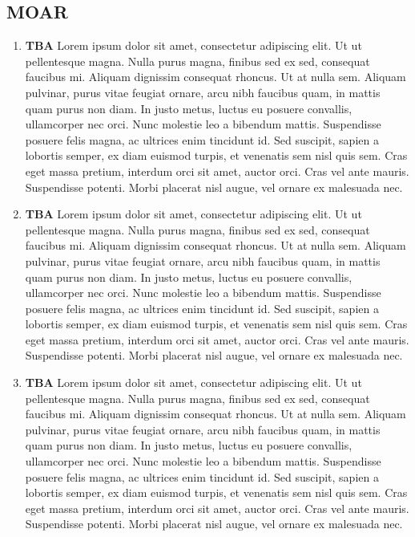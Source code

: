 \subsection{MOAR}\label{subsec:moar}
\begin{enumerate}[label= -]
    \item \textbf{TBA} Lorem ipsum dolor sit amet, consectetur adipiscing elit.
    Ut ut pellentesque magna.
    Nulla purus magna, finibus sed ex sed, consequat faucibus mi.
    Aliquam dignissim consequat rhoncus.
    Ut at nulla sem.
    Aliquam pulvinar, purus vitae feugiat ornare, arcu nibh faucibus quam, in mattis quam purus non diam.
    In justo metus, luctus eu posuere convallis, ullamcorper nec orci.
    Nunc molestie leo a bibendum mattis.
    Suspendisse posuere felis magna, ac ultrices enim tincidunt id.
    Sed suscipit, sapien a lobortis semper, ex diam euismod turpis, et venenatis sem nisl quis sem.
    Cras eget massa pretium, interdum orci sit amet, auctor orci.
    Cras vel ante mauris.
    Suspendisse potenti.
    Morbi placerat nisl augue, vel ornare ex malesuada nec.
    \item \textbf{TBA} Lorem ipsum dolor sit amet, consectetur adipiscing elit.
    Ut ut pellentesque magna.
    Nulla purus magna, finibus sed ex sed, consequat faucibus mi.
    Aliquam dignissim consequat rhoncus.
    Ut at nulla sem.
    Aliquam pulvinar, purus vitae feugiat ornare, arcu nibh faucibus quam, in mattis quam purus non diam.
    In justo metus, luctus eu posuere convallis, ullamcorper nec orci.
    Nunc molestie leo a bibendum mattis.
    Suspendisse posuere felis magna, ac ultrices enim tincidunt id.
    Sed suscipit, sapien a lobortis semper, ex diam euismod turpis, et venenatis sem nisl quis sem.
    Cras eget massa pretium, interdum orci sit amet, auctor orci.
    Cras vel ante mauris.
    Suspendisse potenti.
    Morbi placerat nisl augue, vel ornare ex malesuada nec.
    \item \textbf{TBA} Lorem ipsum dolor sit amet, consectetur adipiscing elit.
    Ut ut pellentesque magna.
    Nulla purus magna, finibus sed ex sed, consequat faucibus mi.
    Aliquam dignissim consequat rhoncus.
    Ut at nulla sem.
    Aliquam pulvinar, purus vitae feugiat ornare, arcu nibh faucibus quam, in mattis quam purus non diam.
    In justo metus, luctus eu posuere convallis, ullamcorper nec orci.
    Nunc molestie leo a bibendum mattis.
    Suspendisse posuere felis magna, ac ultrices enim tincidunt id.
    Sed suscipit, sapien a lobortis semper, ex diam euismod turpis, et venenatis sem nisl quis sem.
    Cras eget massa pretium, interdum orci sit amet, auctor orci.
    Cras vel ante mauris.
    Suspendisse potenti.
    Morbi placerat nisl augue, vel ornare ex malesuada nec.
\end{enumerate}